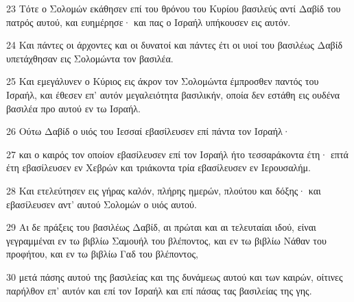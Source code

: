 \par 23 Τότε ο Σολομών εκάθησεν επί του θρόνου του Κυρίου βασιλεύς αντί Δαβίδ του πατρός αυτού, και ευημέρησε· και πας ο Ισραήλ υπήκουσεν εις αυτόν.
\par 24 Και πάντες οι άρχοντες και οι δυνατοί και πάντες έτι οι υιοί του βασιλέως Δαβίδ υπετάχθησαν εις Σολομώντα τον βασιλέα.
\par 25 Και εμεγάλυνεν ο Κύριος εις άκρον τον Σολομώντα έμπροσθεν παντός του Ισραήλ, και έθεσεν επ' αυτόν μεγαλειότητα βασιλικήν, οποία δεν εστάθη εις ουδένα βασιλέα προ αυτού εν τω Ισραήλ.
\par 26 Ούτω Δαβίδ ο υιός του Ιεσσαί εβασίλευσεν επί πάντα τον Ισραήλ·
\par 27 και ο καιρός τον οποίον εβασίλευσεν επί τον Ισραήλ ήτο τεσσαράκοντα έτη· επτά έτη εβασίλευσεν εν Χεβρών και τριάκοντα τρία εβασίλευσεν εν Ιερουσαλήμ.
\par 28 Και ετελεύτησεν εις γήρας καλόν, πλήρης ημερών, πλούτου και δόξης· και εβασίλευσεν αντ' αυτού Σολομών ο υιός αυτού.
\par 29 Αι δε πράξεις του βασιλέως Δαβίδ, αι πρώται και αι τελευταίαι ιδού, είναι γεγραμμέναι εν τω βιβλίω Σαμουήλ του βλέποντος, και εν τω βιβλίω Νάθαν του προφήτου, και εν τω βιβλίω Γαδ του βλέποντος,
\par 30 μετά πάσης αυτού της βασιλείας και της δυνάμεως αυτού και των καιρών, οίτινες παρήλθον επ' αυτόν και επί τον Ισραήλ και επί πάσας τας βασιλείας της γης.


